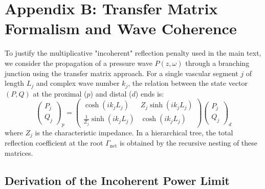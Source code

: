
\section{Appendix B: Transfer Matrix Formalism and Wave Coherence}
\label{app:transfer}

To justify the multiplicative "incoherent" reflection penalty used in the main
text, we consider the propagation of a pressure wave $P(z, \omega)$ through a
branching junction using the transfer matrix approach. For a single vascular
segment $j$ of length $L_j$ and complex wave number $k_j$, the relation between
the state vector $(P, Q)$ at the proximal ($p$) and distal ($d$) ends is:
\begin{equation}
    \begin{pmatrix} P_j \\ Q_j \end{pmatrix}_p = 
    \begin{pmatrix} \cosh(i k_j L_j) & Z_j \sinh(i k_j L_j) \\ \frac{1}{Z_j} \sinh(i k_j L_j) & \cosh(i k_j L_j) \end{pmatrix}
    \begin{pmatrix} P_j \\ Q_j \end{pmatrix}_d
\end{equation}
where $Z_j$ is the characteristic impedance. In a hierarchical tree, the total
reflection coefficient at the root $\Gamma_{\mathrm{net}}$ is obtained by the
recursive nesting of these matrices.

\subsection{Derivation of the Incoherent Power Limit}

